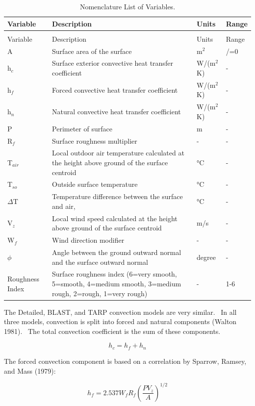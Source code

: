 \begin{longtable}[c]{p{1.5in}p{2.5in}p{1.0in}p{1.0in}}

\caption{Nomenclature List of Variables. \label{table:nomenclature-list-of-variables.-001}} \tabularnewline
\toprule 
Variable & Description & Units & Range \tabularnewline
\midrule
\endfirsthead

\caption[]{Nomenclature List of Variables.} \tabularnewline
\toprule 
Variable & Description & Units & Range \tabularnewline
\midrule
\endhead

A & Surface area of the surface & m\(^{2}\) & /=0 \tabularnewline
h\(_{c}\) & Surface exterior convective heat transfer coefficient & W/(m\(^{2}\)K) & - \tabularnewline
h\(_{f}\) & Forced convective heat transfer coefficient & W/(m\(^{2}\)K) & - \tabularnewline
h\(_{n}\) & Natural convective heat transfer coefficient & W/(m\(^{2}\)K) & - \tabularnewline
P & Perimeter of surface & m & - \tabularnewline
R\(_{f}\) & Surface roughness multiplier & - & - \tabularnewline
T\(_{air}\) & Local outdoor air temperature calculated at the height above ground of the surface centroid & °C & - \tabularnewline
T\(_{so}\) & Outside surface temperature & °C & - \tabularnewline
$\Delta$T & Temperature difference between the surface and air, & °C & - \tabularnewline
V\(_{z}\) & Local wind speed calculated at the height above ground of the surface centroid & m/s & - \tabularnewline
W\(_{f}\) & Wind direction modifier & - & - \tabularnewline
$\phi$ & Angle between the ground outward normal and the surface outward normal & degree & - \tabularnewline
Roughness Index & Surface roughness index (6=very smooth, 5=smooth, 4=medium smooth, 3=medium rough, 2=rough, 1=very rough) & - & 1-6 \tabularnewline
\bottomrule
\end{longtable}

The Detailed, BLAST, and TARP convection models are very similar.~ In all three models, convection is split into forced and natural components (Walton 1981).~ The total convection coefficient is the sum of these components.

\begin{equation}
{h_c} = {h_f} + {h_n}
\end{equation}

The forced convection component is based on a correlation by Sparrow, Ramsey, and Mass (1979):

\begin{equation}
{h_f} = 2.537{W_f}{R_f}{\left( {\frac{{P{V_z}}}{A}} \right)^{1/2}}
\end{equation}

